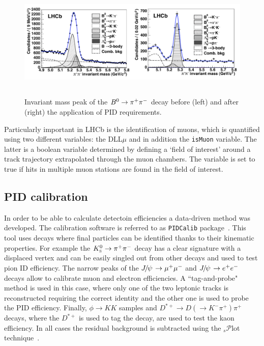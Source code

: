 \begin{figure}[h!]
\centering
\includegraphics[width=1.\textwidth,height=5.5cm]{Detector/figs/pid_peaks.png}
\caption{Invariant mass peak of the $\Bz\to\pi^+\pi^-$ decay before (left) and
after (right) the application of PID requirements. }
\label{fig:pid_peaks}
\end{figure}
%
Particularly important in LHCb is the identification of muons, which is quantified using two different variables: the DLL$\mu$
and in addition the \verb!isMuon! variable. The latter is a boolean variable determined by defining a `field of interest' around 
a track trajectory extrapolated through the muon chambers. The variable is set to true if hits in multiple muon stations are 
found in the field of interest.

\subsection{PID calibration}
\label{sec:PID_calib}

In order to be able to calculate detectoin efficiencies a data-driven method was developed.
The calibration software is referred to as \verb!PIDCalib! package~\cite{Aaij:1978280}. 
This tool uses decays where final  particles can be identified thanks to their kinematic properties.
For example the $\KS\to\pi^+\pi^-$ decay has a clear signature with a displaced vertex
and can be easily singled out from other decays and used to test pion ID efficiency.
The narrow peaks of the $\jpsi\to\mumu$ and $\jpsi\to\ee$ decays allow to calibrate
muon and electron efficiencies. A ``tag-and-probe" method is used in this case, where only one 
of the two leptonic tracks is reconstructed requiring the correct identity and the other one
is used to probe the PID efficiency. Finally,  $\phi\to KK$ samples and 
$D^{*+}\to D(\to K^-\pi^+)\pi^+$ decays, where the $D^{*+}$ is used to tag the decay,
are used to test the kaon efficiency. In all cases the residual background is subtracted using
the $_s\mathcal{P}$lot technique~\cite{sPlot}.



